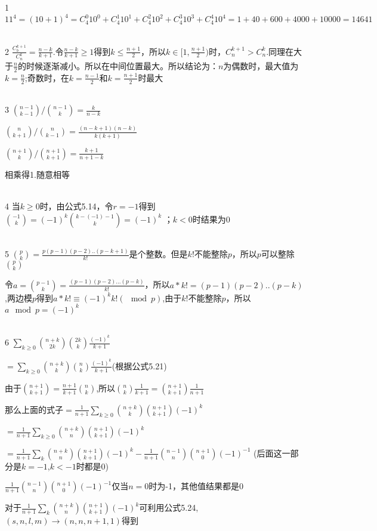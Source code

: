 \documentclass[onecolumn]{article}
\begin{document}
1 $11^{4}=(10+1)^{4}=C_{4}^{0}10^{0}+C_{4}^{1}10^{1}+C_{4}^{2}10^{2}+C_{4}^{3}10^{3}+C_{4}^{4}10^{4}=1+40+600+4000+10000=14641$ \par
~\\
2 $\frac{C_{b}^{k+1}}{C_{n}^{k}}=\frac{n-k}{k+1}$.令$\frac{n-k}{k+1}\ge 1$得到$k\le \frac{n+1}{2}$，所以$k \in [1, \frac{n+1}{2})$时，$C_{n}^{k+1}>C_{n}^{k}$.同理在大于$\frac{n}{2}$的时候逐渐减小。所以在中间位置最大。所以结论为：$n$为偶数时，最大值为$k=\frac{n}{2}$;奇数时，在$k=\frac{n-1}{2}$和$k=\frac{n+1}{2}$时最大 \par 
~\\
3 $\binom{n-1}{k-1}/\binom{n-1}{k}=\frac{k}{n-k}$\par
$\binom{n}{k+1}/\binom{n}{k-1}=\frac{(n-k+1)(n-k)}{k(k+1)}$ \par
$\binom{n+1}{k}/\binom{n+1}{k+1}=\frac{k+1}{n+1-k}$ \par
相乘得1.随意相等 \par
~\\
4 当$k \ge 0$时，由公式5.14，令$r=-1$得到$\binom{-1}{k}=(-1)^{k}\binom{k-(-1)-1}{k}=(-1)^{k}$ ；$k<0$时结果为0 \par
~\\
5 $\binom{p}{k}=\frac{p(p-1)(p-2)..(p-k+1)}{k!}$是个整数。但是$k!$不能整除$p$，所以$p$可以整除$\binom{p}{k}$\par
令$a=\binom{p-1}{k}=\frac{(p-1)(p-2)...(p-k)}{k!}$，所以$a*k!=(p-1)(p-2)..(p-k)$,两边模$p$得到$a*k!\equiv (-1)^{k}k!(\mod p)$,由于$k!$不能整除$p$，所以$a\mod p=(-1)^{k}$ \par
~\\
6 $\sum_{k\ge 0}\binom{n+k}{2k}\binom{2k}{k}\frac{(-1)^{k}}{k+1}$ \par
$=\sum_{k\ge 0}\binom{n+k}{k}\binom{n}{k}\frac{(-1)^{k}}{k+1}$(根据公式5.21)  \par
由于$\binom{n+1}{k+1}=\frac{n+1}{k+1}\binom{n}{k}$,所以$\binom{n}{k}\frac{1}{k+1}=\binom{n+1}{k+1}\frac{1}{n+1}$ \par
那么上面的式子$=\frac{1}{n+1}\sum_{k\ge 0}\binom{n+k}{k}\binom{n+1}{k+1}(-1)^{k}$ \par
$=\frac{1}{n+1}\sum_{k\ge 0}\binom{n+k}{n}\binom{n+1}{k+1}(-1)^{k}$ \par
$=\frac{1}{n+1}\sum_{k}\binom{n+k}{n}\binom{n+1}{k+1}(-1)^{k}-\frac{1}{n+1}\binom{n-1}{n}\binom{n+1}{0}(-1)^{-1}$ (后面这一部分是$k=-1$,$k<-1$时都是0)\par
$\frac{1}{n+1}\binom{n-1}{n}\binom{n+1}{0}(-1)^{-1}$仅当$n=0$时为-1，其他值结果都是0 \par
对于$\frac{1}{n+1}\sum_{k}\binom{n+k}{n}\binom{n+1}{k+1}(-1)^{k}$可利用公式5.24,$(s,n,l,m)\rightarrow(n,n,n+1,1)$得到 \par
\end{document}
